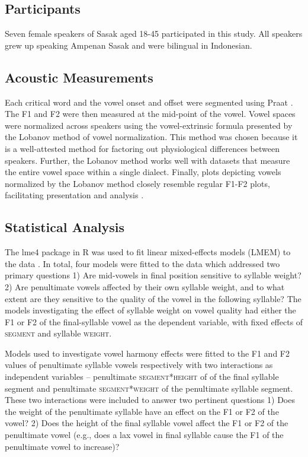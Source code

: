 \documentclass[12pt]{ouparticle}
\begin{document}
\subsection{Participants}\label{sec:participants}

Seven female speakers of Sasak aged 18-45 participated in this study. All speakers grew up speaking Ampenan Sasak and were bilingual in Indonesian. 

\subsection{Acoustic Measurements}\label{sec:measurements}
Each critical word and the vowel onset and offset were segmented using Praat \citep{boersma2019}. The F1 and F2 were then measured at the mid-point of the vowel. Vowel spaces were normalized across speakers using the vowel-extrinsic formula presented by the Lobanov method of vowel normalization. This method was chosen because it is a well-attested method for factoring out physiological differences between speakers. Further, the Lobanov method works well with datasets that measure the entire vowel space within a single dialect. Finally, plots depicting vowels normalized by the Lobanov method closely resemble regular F1-F2 plots, facilitating presentation and analysis \citep{adank2004}.

\subsection{Statistical Analysis}\label{sec:analysis}
The lme4 package in R was used to fit linear mixed-effects models (LMEM) to the data \citep{bates2014}. In total, four models were fitted to the data which addressed two primary questions 1) Are mid-vowels in final position sensitive to syllable weight? 2) Are penultimate vowels affected by their own syllable weight, and to what extent are they sensitive to the quality of the vowel in the following syllable? The models investigating the effect of syllable weight on vowel quality had either the F1 or F2 of the final-syllable vowel as the dependent variable, with fixed effects of \textsc{segment} and syllable \textsc{weight}. 

Models used to investigate vowel harmony effects were fitted to the F1 and F2 values of penultimate syllable vowels respectively with two interactions as independent variables -- penultimate \textsc{segment}*\textsc{height} of of the final syllable segment and penultimate \textsc{segment}*\textsc{weight} of the penultimate syllable segment. These two interactions were included to answer two pertinent questions 1) Does the weight of the penultimate syllable have an effect on the F1 or F2 of the vowel? 2) Does the height of the final syllable vowel affect the F1 or F2 of the penultimate vowel (e.g., does a lax vowel in final syllable cause the F1 of the penultimate vowel to increase)? 
\end{document}
